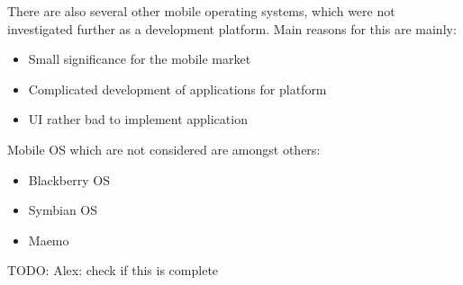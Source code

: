 There are also several other mobile operating systems, which were not
investigated further as a development platform.
Main reasons for this are mainly:
\begin{itemize}
  \item Small significance for the mobile market
  \item Complicated development of applications for platform
  \item UI rather bad to implement application
\end{itemize}

Mobile OS which are not considered are amongst others:
\begin{itemize}
  \item Blackberry OS
  \item Symbian OS
  \item Maemo
\end{itemize}

TODO: Alex: check if this is complete

